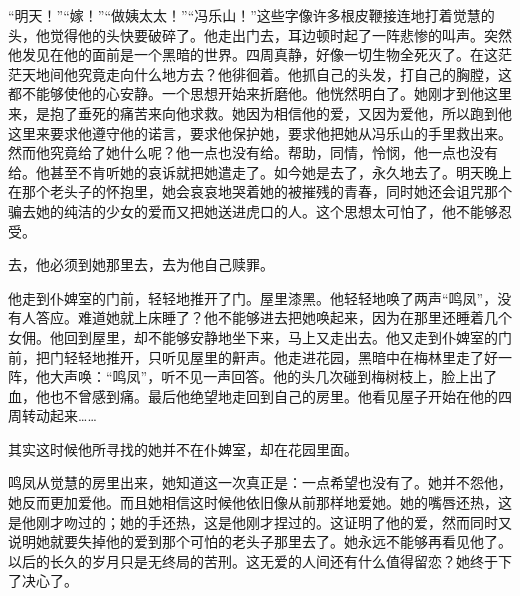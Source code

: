 \par “明天！”“嫁！”“做姨太太！”“冯乐山！”这些字像许多根皮鞭接连地打着觉慧的头，他觉得他的头快要破碎了。他走出门去，耳边顿时起了一阵悲惨的叫声。突然他发见在他的面前是一个黑暗的世界。四周真静，好像一切生物全死灭了。在这茫茫天地间他究竟走向什么地方去？他徘徊着。他抓自己的头发，打自己的胸膛，这都不能够使他的心安静。一个思想开始来折磨他。他恍然明白了。她刚才到他这里来，是抱了垂死的痛苦来向他求救。她因为相信他的爱，又因为爱他，所以跑到他这里来要求他遵守他的诺言，要求他保护她，要求他把她从冯乐山的手里救出来。然而他究竟给了她什么呢？他一点也没有给。帮助，同情，怜悯，他一点也没有给。他甚至不肯听她的哀诉就把她遣走了。如今她是去了，永久地去了。明天晚上在那个老头子的怀抱里，她会哀哀地哭着她的被摧残的青春，同时她还会诅咒那个骗去她的纯洁的少女的爱而又把她送进虎口的人。这个思想太可怕了，他不能够忍受。
\par 去，他必须到她那里去，去为他自己赎罪。
\par 他走到仆婢室的门前，轻轻地推开了门。屋里漆黑。他轻轻地唤了两声“鸣凤”，没有人答应。难道她就上床睡了？他不能够进去把她唤起来，因为在那里还睡着几个女佣。他回到屋里，却不能够安静地坐下来，马上又走出去。他又走到仆婢室的门前，把门轻轻地推开，只听见屋里的鼾声。他走进花园，黑暗中在梅林里走了好一阵，他大声唤：“鸣凤”，听不见一声回答。他的头几次碰到梅树枝上，脸上出了血，他也不曾感到痛。最后他绝望地走回到自己的房里。他看见屋子开始在他的四周转动起来……
\par 其实这时候他所寻找的她并不在仆婢室，却在花园里面。
\par 鸣凤从觉慧的房里出来，她知道这一次真正是：一点希望也没有了。她并不怨他，她反而更加爱他。而且她相信这时候他依旧像从前那样地爱她。她的嘴唇还热，这是他刚才吻过的；她的手还热，这是他刚才捏过的。这证明了他的爱，然而同时又说明她就要失掉他的爱到那个可怕的老头子那里去了。她永远不能够再看见他了。以后的长久的岁月只是无终局的苦刑。这无爱的人间还有什么值得留恋？她终于下了决心了。
